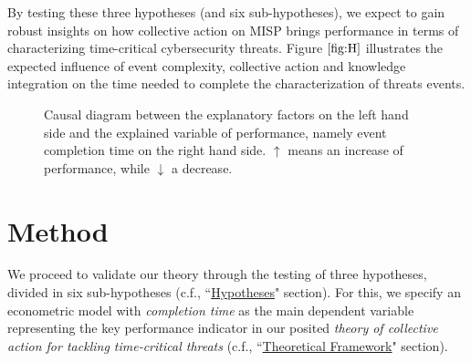 \documentclass[unnumsec,webpdf,contemporary,large]{oup-authoring-template}%
\theoremstyle{thmstyleone}%
\theoremstyle{thmstyletwo}%
\theoremstyle{thmstylethree}%
\begin{document}
By testing these three hypotheses (and six sub-hypotheses), we expect to gain robust insights on how collective action on MISP brings performance in terms of characterizing time-critical cybersecurity threats. Figure $\ref{fig:H}$ illustrates the expected influence of event complexity, collective action and knowledge integration on the time needed to complete the characterization of threats events.

\begin{figure}[!ht]
\begin{center}
\caption{Causal diagram between the explanatory factors on the left hand side and the explained variable of performance, namely event completion time on the right hand side. $\uparrow$ means an increase of performance, while $\downarrow$ a decrease.}
\label{fig:H}
\end{center}
\end{figure}

\section{Method}
\label{sec:method}

We proceed to validate our theory through the testing of three hypotheses, divided in six sub-hypotheses (c.f., ``\hyperref[sec:hypotheses]{Hypotheses}" section).  For this, we specify an econometric model with {\it completion time} as the main dependent variable representing the key performance indicator in our posited {\it theory of collective action for tackling time-critical threats} (c.f.,  ``\hyperref[sec:theory]{Theoretical Framework}" section).
\end{document}
